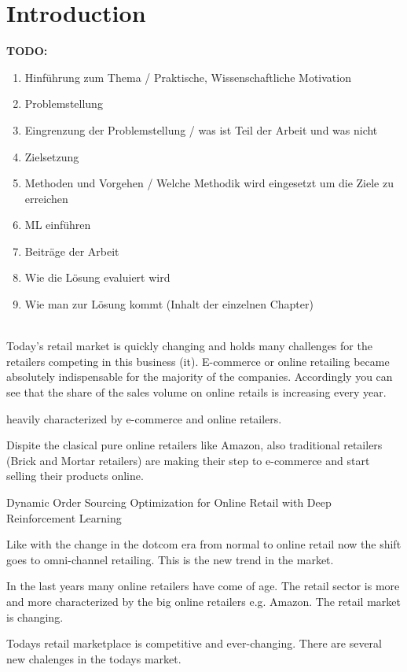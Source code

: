 \chapter{Introduction} 
\label{sec:chapter1}

\begin{framed}
\textbf{TODO:}
\begin{enumerate}
\item Hinführung zum Thema / Praktische, Wissenschaftliche Motivation
\item Problemstellung
\item Eingrenzung der Problemstellung / was ist Teil der Arbeit und was nicht
\item Zielsetzung
\item Methoden und Vorgehen / Welche Methodik wird eingesetzt um die Ziele zu erreichen
\item ML einführen
\item Beiträge der Arbeit
\item Wie die Lösung evaluiert wird
\item Wie man zur Lösung kommt (Inhalt der einzelnen Chapter)
\end{enumerate}
\end{framed}\\

Today's retail market is quickly changing and holds many challenges for the retailers competing in this business (it). E-commerce or online retailing became absolutely indispensable for the majority of the companies. Accordingly you can see that the share of the sales volume on online retails is increasing every year.


heavily characterized by e-commerce and online retailers. 

Dispite the clasical pure online retailers like Amazon, also traditional retailers (Brick and Mortar retailers) are making their step to e-commerce and start selling their products online.

Dynamic Order Sourcing Optimization for Online Retail with Deep Reinforcement Learning


Like with the change in the dotcom era from normal to online retail now the shift goes to omni-channel retailing. This is the new trend in the market.


In the last years many online retailers have come of age. The retail sector is more and more characterized by the big online retailers e.g. Amazon. The retail market is changing. 

Todays retail marketplace is competitive and ever-changing. There are several new chalenges in the todays market.



